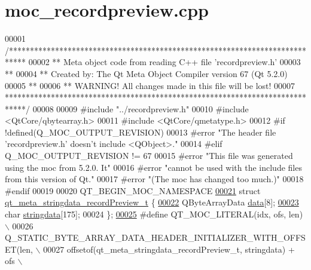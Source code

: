 \hypertarget{a00068_source}{\section{moc\+\_\+recordpreview.\+cpp}
\label{a00068_source}
}

\begin{DoxyCode}
00001 \textcolor{comment}{/****************************************************************************}
00002 \textcolor{comment}{** Meta object code from reading C++ file 'recordpreview.h'}
00003 \textcolor{comment}{**}
00004 \textcolor{comment}{** Created by: The Qt Meta Object Compiler version 67 (Qt 5.2.0)}
00005 \textcolor{comment}{**}
00006 \textcolor{comment}{** WARNING! All changes made in this file will be lost!}
00007 \textcolor{comment}{*****************************************************************************/}
00008 
00009 \textcolor{preprocessor}{#include "../recordpreview.h"}
00010 \textcolor{preprocessor}{#include <QtCore/qbytearray.h>}
00011 \textcolor{preprocessor}{#include <QtCore/qmetatype.h>}
00012 \textcolor{preprocessor}{#if !defined(Q\_MOC\_OUTPUT\_REVISION)}
00013 \textcolor{preprocessor}{#error "The header file 'recordpreview.h' doesn't include <QObject>."}
00014 \textcolor{preprocessor}{#elif Q\_MOC\_OUTPUT\_REVISION != 67}
00015 \textcolor{preprocessor}{#error "This file was generated using the moc from 5.2.0. It"}
00016 \textcolor{preprocessor}{#error "cannot be used with the include files from this version of Qt."}
00017 \textcolor{preprocessor}{#error "(The moc has changed too much.)"}
00018 \textcolor{preprocessor}{#endif}
00019 
00020 QT\_BEGIN\_MOC\_NAMESPACE
\hypertarget{a00068_source_l00021}{}\hyperlink{a00068}{00021} \textcolor{keyword}{struct }\hyperlink{a00068_dd/dc1/a00212}{qt\_meta\_stringdata\_recordPreview\_t} \{
\hypertarget{a00068_source_l00022}{}\hyperlink{a00068_a61be725f4f67b385a56830793423ff45}{00022}     QByteArrayData \hyperlink{a00068_a61be725f4f67b385a56830793423ff45}{data}[8];
\hypertarget{a00068_source_l00023}{}\hyperlink{a00068_af0762b30c491f46fa9caf80c9ae5f6ca}{00023}     \textcolor{keywordtype}{char} \hyperlink{a00068_af0762b30c491f46fa9caf80c9ae5f6ca}{stringdata}[175];
00024 \};
\hypertarget{a00068_source_l00025}{}\hyperlink{a00068_a75bb9482d242cde0a06c9dbdc6b83abe}{00025} \textcolor{preprocessor}{#define QT\_MOC\_LITERAL(idx, ofs, len) \(\backslash\)}
00026 \textcolor{preprocessor}{    Q\_STATIC\_BYTE\_ARRAY\_DATA\_HEADER\_INITIALIZER\_WITH\_OFFSET(len, \(\backslash\)}
00027 \textcolor{preprocessor}{    offsetof(qt\_meta\_stringdata\_recordPreview\_t, stringdata) + ofs \(\backslash\)}

\end{DoxyCode}
